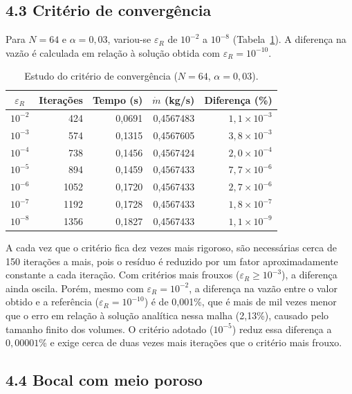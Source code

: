 \subsection*{4.3 Critério de convergência}

Para $N=64$ e $\alpha=0{,}03$, variou-se $\varepsilon_R$ de $10^{-2}$ a
$10^{-8}$ (Tabela~\ref{tab:crit}). A diferença na vazão é calculada em
relação à solução obtida com $\varepsilon_R=10^{-10}$.

\begin{table}[H]
\centering
\caption{Estudo do critério de convergência ($N=64$, $\alpha=0{,}03$).}
\label{tab:crit}
\begin{tabular}{crrrr}
\hline
$\varepsilon_R$ & Iterações & Tempo (s) & $\dot m$ (kg/s) & Diferença (\%)\\
\hline
$10^{-2}$ & 424 & 0,0691 & 0,4567483 & $1{,}1\times10^{-3}$\\
$10^{-3}$ & 574 & 0,1315 & 0,4567605 & $3{,}8\times10^{-3}$\\
$10^{-4}$ & 738 & 0,1456 & 0,4567424 & $2{,}0\times10^{-4}$\\
$10^{-5}$ & 894 & 0,1459 & 0,4567433 & $7{,}7\times10^{-6}$\\
$10^{-6}$ & 1052 & 0,1720 & 0,4567433 & $2{,}7\times10^{-6}$\\
$10^{-7}$ & 1192 & 0,1728 & 0,4567433 & $1{,}8\times10^{-7}$\\
$10^{-8}$ & 1356 & 0,1827 & 0,4567433 & $1{,}1\times10^{-9}$\\
\hline
\end{tabular}
\end{table}

A cada vez que o critério fica dez vezes mais rigoroso, são necessárias
cerca de 150 iterações a mais, pois o resíduo é reduzido por um fator
aproximadamente constante a cada iteração. Com critérios mais frouxos
($\varepsilon_R\ge10^{-3}$), a diferença ainda oscila. Porém, mesmo com
$\varepsilon_R=10^{-2}$, a diferença na vazão entre o valor obtido e a referência 
($\varepsilon_R=10^{-10}$) é de 0,001\%, que é mais de mil vezes menor que o erro 
em relação à solução analítica nessa malha (2,13\%), causado pelo tamanho finito 
dos volumes. O critério adotado ($10^{-5}$) reduz essa diferença a $0,00001$\% e 
exige cerca de duas vezes mais iterações que o critério mais frouxo.

\subsection*{4.4 Bocal com meio poroso}

